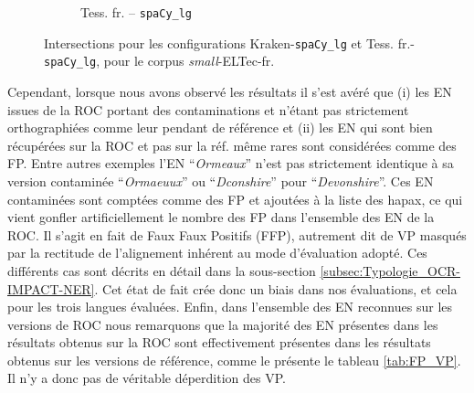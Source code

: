 \begin{figure}[h!]
\begin{minipage}{6.5cm}
\begin{subfigure}{1\textwidth}
  \caption{Tess. fr. -- \texttt{spaCy\_lg}}
 \label{fig:ELTeCFRA_Tess_spaCy3.5.1-concat_intersection}
  \end{subfigure}
    \end{minipage}
\caption{Intersections pour les configurations Kraken-\texttt{spaCy\_lg} et Tess. fr.-\texttt{spaCy\_lg}, pour le corpus \textit{small}-ELTec-fr.}
\label{fig:intersection_globale-kraken-tess}
\end{figure}

Cependant, lorsque nous avons observé les résultats il s'est avéré que (i) les EN issues de la ROC portant des contaminations et n'étant pas strictement orthographiées comme leur pendant de référence et (ii) les EN qui sont bien récupérées sur la ROC et pas sur la réf. même rares sont considérées comme des FP. Entre autres exemples l'EN ``\textit{Ormeaux}'' n'est pas strictement identique à sa version contaminée ``\textit{Ormaeuux}'' ou ``\textit{Dconshire}'' pour ``\textit{Devonshire}''. Ces EN contaminées sont comptées comme des FP et ajoutées à la liste des hapax, ce qui vient gonfler artificiellement le nombre des FP dans l'ensemble des EN de la ROC. Il s'agit en fait de Faux Faux Positifs (FFP), autrement dit de VP masqués par la rectitude de l'alignement inhérent au mode d'évaluation adopté. Ces différents cas sont décrits en détail dans la sous-section \ref{subsec:Typologie_OCR-IMPACT-NER}. Cet état de fait crée donc un biais dans nos évaluations, et cela pour les trois langues évaluées.
 Enfin, dans l'ensemble des EN reconnues sur les versions de ROC nous remarquons que la majorité des EN présentes dans les résultats obtenus sur la ROC sont effectivement présentes dans les résultats obtenus sur les versions de référence, comme le présente le tableau \ref{tab:FP_VP}. Il n'y a donc pas de véritable déperdition des VP. 

